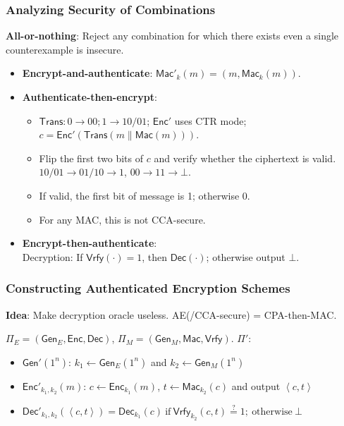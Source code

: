 \begin{frame}\frametitle{Analyzing Security of Combinations}
\textbf{All-or-nothing}: Reject any combination for which there exists even a single counterexample is insecure.
\begin{itemize}
\item \textbf{Encrypt-and-authenticate}: $\mathsf{Mac}'_k(m) = (m, \mathsf{Mac}_k(m))$.
\item \textbf{Authenticate-then-encrypt}: 
\begin{itemize}
\item $\mathsf{Trans}: 0 \to 00; 1 \to 10/01$; $\mathsf{Enc}'$ uses CTR mode; $c = \mathsf{Enc}'(\mathsf{Trans}(m\| \mathsf{Mac}(m)))$.
\item Flip the first two bits of $c$ and verify whether the ciphertext is valid.
$10/01 \to 01/10 \to 1$, $00 \to 11 \to \bot$.
\item If valid, the first bit of message is 1; otherwise 0.\\
\item For any MAC, this is not CCA-secure.
\end{itemize}
\item \textbf{Encrypt-then-authenticate}: \\
Decryption: If $\mathsf{Vrfy}(\cdot) = 1$, then $\mathsf{Dec}(\cdot)$; otherwise output $\bot$.
\end{itemize}
\end{frame}
\begin{frame}\frametitle{Constructing Authenticated Encryption Schemes}
\textbf{Idea}: Make decryption oracle useless. AE(/CCA-secure) = CPA-then-MAC.
\begin{figure}
\begin{center}

\end{center}
\end{figure}
\begin{construction}
$\Pi_E = (\mathsf{Gen}_E, \mathsf{Enc}, \mathsf{Dec})$, $\Pi_M = (\mathsf{Gen}_M, \mathsf{Mac}, \mathsf{Vrfy})$. $\Pi'$:
\begin{itemize}
\item $\mathsf{Gen}'(1^n)$: $k_1 \gets \mathsf{Gen}_E(1^n)$ and $k_2 \gets \mathsf{Gen}_M(1^n)$
\item $\mathsf{Enc}'_{k_1,k_2}(m)$: $c \gets \mathsf{Enc}_{k_1}(m)$, $t \gets \mathsf{Mac}_{k_2}(c)$ and output $\left< c,t \right>$
\item $\mathsf{Dec}'_{k_1,k_2}(\left< c,t \right>) = \mathsf{Dec}_{k_1}(c)\ \text{if}\ \mathsf{Vrfy}_{k_2}(c,t) \overset{?}{=} 1;\ \text{otherwise}\ \bot$
\end{itemize}
\end{construction}
\end{frame}
